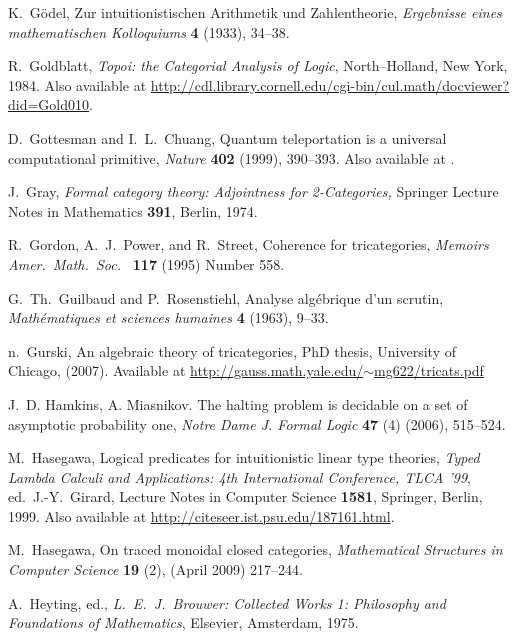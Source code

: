 \documentclass[12pt,twoside,openright]{report}
\begin{document}
\begin{thebibliography}{99}
 K.\ G\"odel, Zur intuitionistischen Arithmetik und Zahlentheorie, {\sl Ergebnisse eines mathematischen Kolloquiums} {\bf 4} (1933), 34--38.
 
 R.\ Goldblatt, {\sl Topoi: the Categorial Analysis of Logic}, North--Holland, New York, 1984. Also available at
\href{http://cdl.library.cornell.edu/cgi-bin/cul.math/docviewer?did=Gold010}
{http://cdl.library.cornell.edu/cgi-bin/cul.math/docviewer?did=Gold010}.

 D.\ Gottesman and I.~L.~Chuang, Quantum teleportation is a universal computational primitive, 
{\sl Nature} {\bf 402} (1999), 390--393. Also available at .

 J.\ Gray, {\sl Formal category theory: Adjointness for 2-Categories,} Springer Lecture Notes in Mathematics \textbf{391}, Berlin, 1974.

 R.\ Gordon, A.\ J.\ Power, and R.\ Street, Coherence for tricategories, \textsl{Memoirs Amer.\ Math.\  Soc.\ } \textbf{117} (1995) Number 558.

 G.\ Th.\ Guilbaud and P.\ Rosenstiehl, Analyse alg\'ebrique d'un scrutin, \textsl{Math\'ematiques et sciences humaines} \textbf{4} (1963), 9--33.

 n.\ Gurski, An algebraic theory of tricategories, PhD thesis, University of Chicago, (2007).  Available at
\href{http://gauss.math.yale.edu/~mg622/tricats.pdf}
{http://gauss.math.yale.edu/$\sim$mg622/tricats.pdf}

 J.~D. Hamkins, A. Miasnikov. The halting problem is decidable on a set of asymptotic probability one, \textsl{Notre Dame J. Formal Logic} \textbf{47} (4) (2006), 515--524.

 M.\ Hasegawa, Logical predicates for intuitionistic linear type theories, {\sl Typed Lambda Calculi and Applications: 4th International Conference, TLCA '99}, ed.\ J.-Y.\ Girard, Lecture Notes in Computer Science {\bf 1581}, Springer, Berlin, 1999. Also available at \href{http://citeseer.ist.psu.edu/187161.html}
{http://citeseer.ist.psu.edu/187161.html}.

 M.\ Hasegawa, On traced monoidal closed categories, \textsl{Mathematical Structures in Computer Science} \textbf{19} (2), (April 2009) 217--244.

 A.\ Heyting, ed., {\sl L.\ E.\ J.\ Brouwer: Collected Works 1: Philosophy and Foundations of Mathematics}, Elsevier, Amsterdam,
1975. 


\end{thebibliography}
\end{document}
